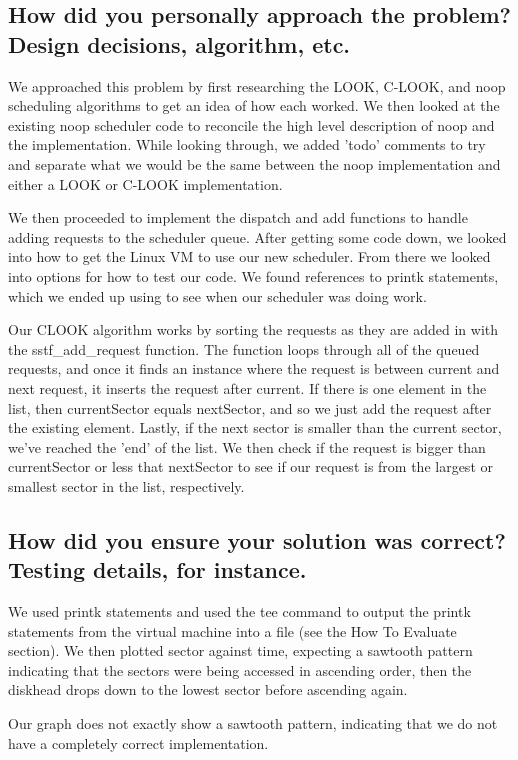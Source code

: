 \documentclass[letterpaper, onecolumn, draftclsnofoot, 10pt, compsoc]{IEEEtran}
\begin{document}
    \subsection{How did you personally approach the problem? Design decisions, algorithm, etc.}
        \begin{singlespace}
            We approached this problem by first researching the LOOK, C-LOOK, and noop scheduling algorithms to get an idea of how each worked.
            We then looked at the existing noop scheduler code to reconcile the high level description of noop and the implementation.
            While looking through, we added 'todo' comments to try and separate what we would be the same between the noop implementation and either a LOOK or C-LOOK implementation. \par
            We then proceeded to implement the dispatch and add functions to handle adding requests to the scheduler queue.
            After getting some code down, we looked into how to get the Linux VM to use our new scheduler. From there we looked into options for how to test our code. We found references to printk statements, which we ended up using to see when our scheduler was doing work.\par
            
            Our CLOOK algorithm works by sorting the requests as they are added in with the sstf\_add\_request function. The function loops through all of the queued requests, and once it finds an instance where the request is between current and next request, it inserts the request after current. If there is one element in the list, then currentSector equals nextSector, and so we just add the request after the existing element. Lastly, if the next sector is smaller than the current sector, we've reached the 'end' of the list. We then check if the request is bigger than currentSector or less that nextSector to see if our request is from the largest or smallest sector in the list, respectively.
        \end{singlespace}
    
    \subsection{How did you ensure your solution was correct? Testing details, for instance.}
        \begin{singlespace}
            We used printk statements and used the tee command to output the printk statements from the virtual machine into a file (see the How To Evaluate section). We then plotted sector against time, expecting a sawtooth pattern indicating that the sectors were being accessed in ascending order, then the diskhead drops down to the lowest sector before ascending again.
            
            Our graph does not exactly show a sawtooth pattern, indicating that we do not have a completely correct implementation.
        \end{singlespace}
    
\end{document}
